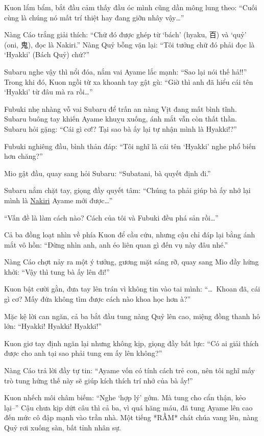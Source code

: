 \documentclass[../main.tex]{subfiles}
\begin{document}
Kuon lẩm bẩm, bắt đầu cảm thấy đầu óc mình cũng dần mông lung theo: ``Cuối cùng là chúng nó mất trí thiệt hay đang giỡn nhây vậy\dots''

Nàng Cáo trắng giải thích: ``Chữ đó được ghép từ `bách' (hyaku, 百) và `quỷ' (oni, 鬼), đọc là Nakiri.'' Nàng Quỷ bỗng vặn lại: ``Tôi tưởng chữ đó phải đọc là `Hyakki' (Bách Quỷ) chứ?''

Subaru nghe vậy thì nổi đóa, nắm vai Ayame lắc mạnh: ``Sao lại nói thế hả!!'' Trong khi đó, Kuon ngồi từ xa khoanh tay gật gù: ``Giờ thì anh đã hiểu cái tên `Hyakki' từ đâu mà ra rồi\dots''

Fubuki nhẹ nhàng vỗ vai Subaru để trấn an nàng Vịt đang mất bình tĩnh. Subaru buông tay khiến Ayame khuỵu xuống, ánh mắt vẫn còn thất thần. Subaru hỏi gặng: ``Cái gì cơ!? Tại sao bà ấy lại tự nhận mình là Hyakki!?''

Fubuki nghiêng đầu, bình thản đáp: ``Tôi nghĩ là cái tên `Hyakki' nghe phổ biến hơn chăng?''

Mio gật đầu, quay sang hỏi Subaru: ``Subatani, bà quyết định đi.''

Subaru nắm chặt tay, giọng đầy quyết tâm: ``Chúng ta phải giúp bà ấy nhớ lại mình là \uline{Nakiri} Ayame mới được\dots''

``Vấn đề là làm cách nào? Cách của tôi và Fubuki đều phá sản rồi\dots''

Cả ba đồng loạt nhìn về phía Kuon để cầu cứu, nhưng cậu chỉ đáp lại bằng ánh mắt vô hồn: ``Đừng nhìn anh, anh éo liên quan gì đến vụ này đâu nhé.''

Nàng Cáo chợt nảy ra một ý tưởng, gương mặt sáng rỡ, quay sang Mio đầy hứng khởi: ``Vậy thì tung bà ấy lên đi!''

Kuon bật cười gằn, đưa tay lên trán vì không tin vào tai mình: ``\dots\ Khoan đã, cái gì cơ? Mấy đứa không tìm được cách nào khoa học hơn à?''

Mặc kệ lời can ngăn, cả ba bắt đầu tung nàng Quỷ lên cao, miệng đồng thanh hô lớn: ``Hyakki! Hyakki! Hyakki!''


Kuon giơ tay định ngăn lại nhưng không kịp, giọng đầy bất lực: ``Có ai giải thích được cho anh tại sao phải tung em ấy lên không?''

Nàng Cáo trả lời đầy tự tin: ``Ayame vốn có tính cách trẻ con, nên tôi nghĩ mấy trò tung hứng thế này sẽ giúp kích thích trí nhớ của bà ấy!''

Kuon nhếch môi châm biếm: ``Nghe `hợp lý' gớm. Mà tung cho cẩn thận, kẻo lại--'' Cậu chưa kịp dứt câu thì cả ba, vì quá hăng máu, đã tung Ayame lên cao đến mức cô đập mạnh vào trần nhà. Một tiếng *RẦM* chát chúa vang lên, nàng Quỷ rơi xuống sàn, bất tỉnh nhân sự.
\end{document}
